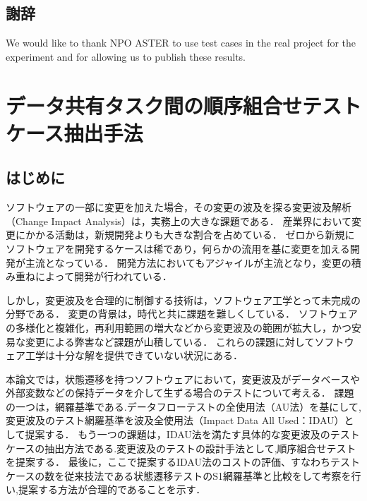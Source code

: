\documentclass[a4paper,12pt]{jreport}
\begin{document}
\section{謝辞}
We would like to thank NPO ASTER to use test cases in the real project for the experiment and for allowing us to publish these results.



\chapter{データ共有タスク間の順序組合せテストケース抽出手法}

\section{はじめに}
ソフトウェアの一部に変更を加えた場合，その変更の波及を探る変更波及解析（Change Impact Analysis）は，実務上の大きな課題である．
産業界において変更にかかる活動は，新規開発よりも大きな割合を占めている．
ゼロから新規にソフトウェアを開発するケースは稀であり，何らかの流用を基に変更を加える開発が主流となっている．
開発方法においてもアジャイルが主流となり，変更の積み重ねによって開発が行われている．

しかし，変更波及を合理的に制御する技術は，ソフトウェア工学とって未完成の分野である\cite{arnold1996software}．
変更の背景は，時代と共に課題を難しくしている．
ソフトウェアの多様化と複雑化，再利用範囲の増大などから変更波及の範囲が拡大し，かつ安易な変更による弊害など課題が山積している．
これらの課題に対してソフトウェア工学は十分な解を提供できていない状況にある\cite{li2013survey}．


本論文では，状態遷移を持つソフトウェアにおいて，変更波及がデータベースや外部変数などの保持データを介して生ずる場合のテストについて考える．
課題の一つは，網羅基準である.データフローテストの全使用法（AU法）\cite{beiz90}を基にして,変更波及のテスト網羅基準を波及全使用法（Impact Data All Used：IDAU）として提案する．
もう一つの課題は，IDAU法を満たす具体的な変更波及のテストケースの抽出方法である.変更波及のテストの設計手法として,順序組合せテストを提案する．
最後に，ここで提案するIDAU法のコストの評価、すなわちテストケースの数を従来技法である状態遷移テストのS1網羅基準と比較をして考察を行い,提案する方法が合理的であることを示す．

\end{document}
